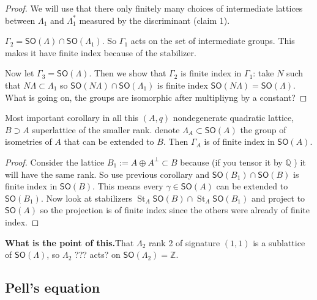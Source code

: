 \begin{proof}\leavevmode
	We will use that there only finitely many choices of intermediate lattices between  $\Lambda_1$ and $\Lambda_1^*$ measured by the discriminant (claim 1).

	$\Gamma_2=\mathsf{SO}(\Lambda)\cap \mathsf{SO}(\Lambda_1)$. So $\Gamma_1$ acts on the set of intermediate groups. This makes it have finite index because of the stabilizer.

	Now let $\Gamma_3=\mathsf{SO}(\Lambda)$. Then we show that $\Gamma_2$ is finite index in $\Gamma_1$: take $N$ such that $N\Lambda\subset \Lambda_1$ so $\mathsf{SO}(N\Lambda)\cap \mathsf{SO}(\Lambda_1)$ is finite index $\mathsf{SO}(N\Lambda)=\mathsf{SO}(\Lambda)$. {\color{4}What is going on, the groups are isomorphic after multipliyng by a constant?}
\end{proof}

\begin{thing2}{Most important corollary in all this}\leavevmode
	$(A,q)$ nondegenerate quadratic lattice,  $B \supset A$ superlattice of the {\color{8}smaller} rank. denote $\Lambda_A \subset \mathsf{SO}(A)$ the group of isometries of $A$ that can be extended to $B$. {\color{4}Then $\Gamma_A$ is of finite index in $\mathsf{SO}(A)$}.
\end{thing2}

\begin{proof}\leavevmode
	Consider the lattice $B_1:=A \oplus A^\perp \subset B$ because (if you tensor it by $\mathbb{Q}$ ) it will have the same rank. So use previous corollary and $\mathsf{SO}(B_1)\cap \mathsf{SO}(B)$ is finite index in $\mathsf{SO}(B)$. This means every $\gamma\in\mathsf{SO}(A)$ can be extended to $\mathsf{SO}(B_1)$. Now look at stabilizers $\operatorname{S t }_A\mathsf{SO}(B) \cap \operatorname{S t}_A\mathsf{SO}(B_1)$ and project to $\mathsf{SO}(A)$ so the projection is of finite index since the others were already of finite index.
\end{proof}

{\color{8}\bfseries What is the point of this.}\hspace{.5em}That $\Lambda_2$ rank 2 of signature $(1,1)$ is a sublattice of  $\mathsf{SO}(\Lambda)$, so $\Lambda_2$ ??? acts? on $\mathsf{SO}(\Lambda_2)=\mathbb{Z}$.

\subsection{Pell's equation}

